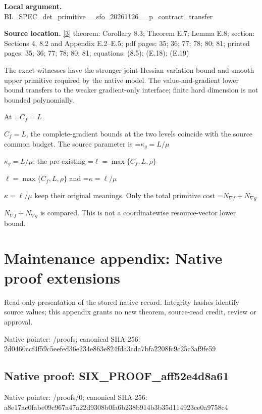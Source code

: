 \documentclass[10pt,a4paper]{article}
\newcommand{\AtlasMath}[1]{\par\begingroup\centering\setbox0=\hbox{$\displaystyle #1$}\ifdim\wd0>1.4\linewidth\typeout{ATLAS WIDE FORMULA: \the\wd0}\fi\ifdim\wd0>\linewidth\resizebox{\linewidth}{!}{\box0}\else\box0\fi\par\endgroup}
\newcommand{\AtlasInlineMath}[1]{\begingroup\setbox0=\hbox{$#1$}\ifdim\wd0>.4\linewidth\endgroup\AtlasMath{#1}\else\endgroup$#1$\fi}
\begin{document}
\textbf{Local argument.} BL\_SPEC\_det\_primitive\_\_s\allowbreak{}fo\_20261126\_\_p\_contract\_\allowbreak{}transfer



\textbf{Source location.} \href{https://github.com/WU-Wendao/Colombo/blob/main/colombo_sensorium/Complexity_altas/data/sources/colombo/SFO_JOINT_20261126/manuscript.pdf}{[3]} theorem: Corollary 8.3; Theorem E.7; Lemma E.8; section: Sections 4, 8.2 and Appendix E.2--E.5; pdf pages: 35; 36; 77; 78; 80; 81; printed pages: 35; 36; 77; 78; 80; 81; equations: (8.5); (E.18); (E.19)



The exact witnesses have the stronger joint-Hessian variation bound and smooth upper primitive required by the native model. The value-and-gradient lower bound transfers to the weaker gradient-only interface; finite hard dimension is not bounded polynomially.



At \AtlasInlineMath{C_f=L}, the complete-gradient bounds at the two levels coincide with the source common budget. The source parameter is \AtlasInlineMath{\kappa_g=L/\mu}; the pre-existing \AtlasInlineMath{\ell=\max\{C_f,L,\rho\}} and \AtlasInlineMath{\kappa=\ell/\mu} keep their original meanings. Only the total primitive cost \AtlasInlineMath{N_{\nabla f}+N_{\nabla g}} is compared. This is not a coordinatewise resource-vector lower bound.



\section{Maintenance appendix: Native proof extensions}


Read-only presentation of the stored native record. Integrity hashes identify source values; this appendix grants no new theorem, source-read credit, review or approval.



Native pointer: /proofs; canonical SHA-256: 2d0460ccf4f59c5eefed36e2\allowbreak{}34e863e824fda3cda7bfa220\allowbreak{}8fc9c25c3af9fe59



\subsection{Native proof: SIX\_PROOF\_aff52e4d8a61}


Native pointer: /proofs/0; canonical SHA-256: a8e17ac0fabe09c967a47a22\allowbreak{}d9308b0fa6b238b914b3b35d\allowbreak{}114923ce0a9758c4
\end{document}

